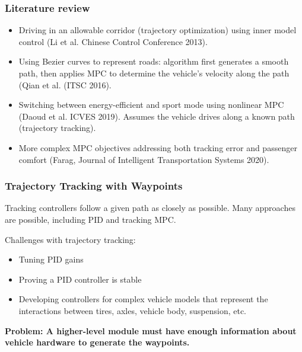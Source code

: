 \documentclass{beamer}
\begin{document}
\begin{frame}
\frametitle{Literature review}
\begin{itemize}

\item Driving in an allowable corridor (trajectory optimization) using inner model control (Li et al. Chinese Control Conference 2013).


\item Using Bezier curves to represent roads: algorithm first generates a smooth path, then applies MPC to determine the vehicle's velocity along the path (Qian et al.  (ITSC 2016).



\item Switching between energy-efficient and sport mode using nonlinear MPC (Daoud et al. ICVES 2019). Assumes the vehicle drives along a known path (trajectory tracking).

\item More complex MPC objectives addressing both tracking error and passenger comfort (Farag, Journal of Intelligent Transportation Systems 2020).

\end{itemize}
\end{frame}

\begin{frame}
	\frametitle{Trajectory Tracking with Waypoints}
Tracking controllers follow a given path as closely as possible. Many approaches are possible, including PID and tracking MPC.

Challenges with trajectory tracking:
	\begin{itemize}
		\item Tuning PID gains
		\item Proving a PID controller is stable
		\item Developing controllers for complex vehicle models that represent the interactions between tires, axles, vehicle body, suspension, etc.
	\end{itemize}
\textbf{Problem: A higher-level module must have enough information about vehicle hardware to generate the waypoints.}
\end{frame}
	
\end{document}

